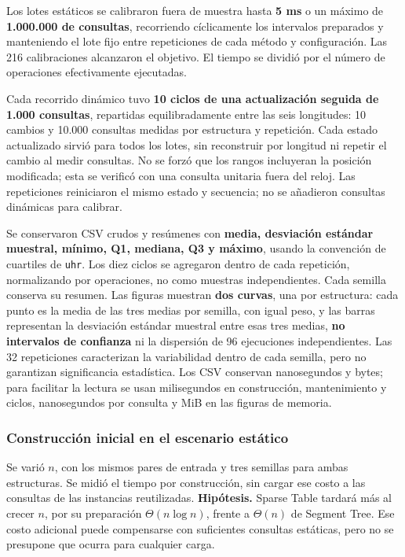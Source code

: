 Los lotes estáticos se calibraron fuera de muestra hasta \textbf{5 ms} o
un máximo de \textbf{1.000.000 de consultas}, recorriendo cíclicamente los
intervalos preparados y manteniendo el lote fijo entre repeticiones de cada
método y configuración. Las 216 calibraciones alcanzaron el objetivo.
El tiempo se dividió por el número de operaciones efectivamente ejecutadas.

Cada recorrido dinámico tuvo \textbf{10 ciclos de una actualización seguida
de 1.000 consultas}, repartidas equilibradamente entre las seis longitudes:
10 cambios y 10.000 consultas medidas por estructura y repetición. Cada estado
actualizado sirvió para todos los lotes, sin reconstruir por longitud ni
repetir el cambio al medir consultas. No se forzó que los rangos incluyeran
la posición modificada; esta se verificó con una consulta unitaria fuera
del reloj. Las repeticiones reiniciaron el mismo estado y secuencia; no se
añadieron consultas dinámicas para calibrar.

Se conservaron CSV crudos y resúmenes con \textbf{media, desviación estándar
muestral, mínimo, Q1, mediana, Q3 y máximo}, usando la convención de cuartiles
de \texttt{uhr}. Los diez ciclos se agregaron dentro de cada repetición,
normalizando por operaciones, no como muestras independientes. Cada semilla
conserva su resumen. Las figuras muestran \textbf{dos curvas}, una por
estructura: cada punto es la media de las tres medias por semilla, con
igual peso, y las barras representan la desviación estándar muestral entre
esas tres medias, \textbf{no intervalos de confianza} ni la dispersión de 96
ejecuciones independientes. Las 32 repeticiones caracterizan la variabilidad
dentro de cada semilla, pero no garantizan significancia estadística.
Los CSV conservan nanosegundos y bytes; para facilitar la lectura se usan
milisegundos en construcción, mantenimiento y ciclos, nanosegundos por consulta
y MiB en las figuras de memoria.
\subsubsection{Construcción inicial en el escenario estático}

Se varió \(n\), con los mismos pares de entrada y tres semillas para ambas
estructuras. Se midió el tiempo por construcción, sin cargar ese costo a
las consultas de las instancias reutilizadas.
\textbf{Hipótesis.} Sparse Table tardará más al crecer \(n\), por su
preparación \(\Theta(n\log n)\), frente a \(\Theta(n)\) de Segment Tree.
Ese costo adicional puede compensarse con suficientes consultas estáticas,
pero no se presupone que ocurra para cualquier carga.

